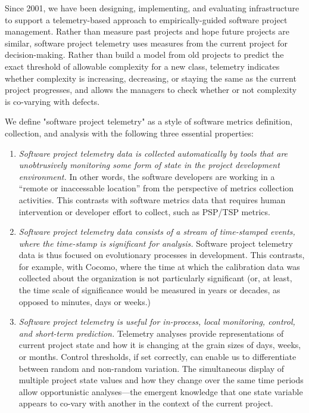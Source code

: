 \documentclass[11pt,twocolumn]{article}
\begin{document}
Since 2001, we have been designing, implementing, and evaluating
infrastructure to support a telemetry-based approach to empirically-guided
software project management. Rather than measure past projects and hope
future projects are similar, software project telemetry uses measures from
the current project for decision-making.  Rather than build a model from
old projects to predict the exact threshold of allowable complexity for a
new class, telemetry indicates whether complexity is increasing,
decreasing, or staying the same as the current project progresses, and
allows the managers to check whether or not complexity is co-varying with
defects.

We define "software project telemetry" as a style of software metrics
definition, collection, and analysis with the following three essential
properties:

\begin{enumerate}

\item {\em Software project telemetry data is collected automatically by tools
   that are unobtrusively monitoring some form of state in the project
   development environment.}  In other words, the software developers are
   working in a ``remote or inaccessable location'' from the perspective of
   metrics collection activities. This contrasts with software metrics data
   that requires human intervention or developer effort to collect, such as
   PSP/TSP metrics.
        
\item {\em Software project telemetry data consists of a stream of time-stamped
   events, where the time-stamp is significant for analysis.} Software
   project telemetry data is thus focused on evolutionary processes in
   development.  This contrasts, for example, with Cocomo, where the time
   at which the calibration data was collected about the organization is
   not particularly significant (or, at least, the time scale of
   significance would be measured in years or decades, as opposed to
   minutes, days or weeks.)
        
\item {\em Software project telemetry is useful for in-process, local
   monitoring, control, and short-term prediction.} Telemetry analyses
   provide representations of current project state and how it is changing
   at the grain sizes of days, weeks, or months.  Control thresholds, if
   set correctly, can enable us to differentiate between random and
   non-random variation.  The simultaneous display of multiple project
   state values and how they change over the same time periods allow
   opportunistic analyses---the emergent knowledge that one state variable
   appears to co-vary with another in the context of the current project.

\end{enumerate}
\end{document}
